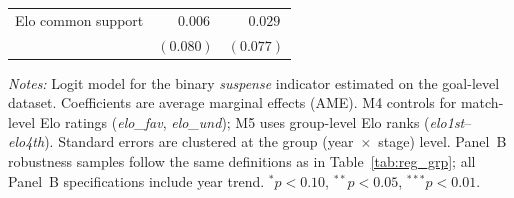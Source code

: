 \begin{table}[H]
\begin{threeparttable}
\begin{tabular}{l cc cc}
Elo common support      & \multicolumn{2}{c}{$\phantom{-}0.006$} & \multicolumn{2}{c}{$\phantom{-}0.029$} \\
                        & \multicolumn{2}{c}{$(0.080)$} & \multicolumn{2}{c}{$(0.077)$} \\
\bottomrule
\end{tabular}
\begin{tablenotes}
\small
\item \textit{Notes:} Logit model for the binary \textit{suspense} indicator estimated on the goal-level dataset. Coefficients are average marginal effects (AME). M4 controls for match-level Elo ratings (\textit{elo\_fav}, \textit{elo\_und}); M5 uses group-level Elo ranks (\textit{elo1st}--\textit{elo4th}). Standard errors are clustered at the group (year~$\times$~stage) level. Panel~B robustness samples follow the same definitions as in Table~\ref{tab:reg_grp}; all Panel~B specifications include year trend. $^{*}p<0.10$, $^{**}p<0.05$, $^{***}p<0.01$.
\end{tablenotes}
\end{threeparttable}
\end{table}
